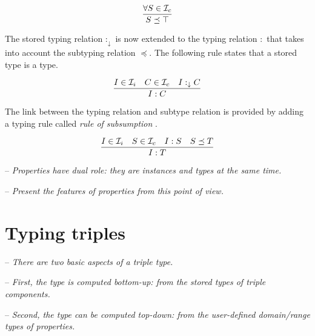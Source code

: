 \documentclass[runningheads]{llncs}
\newcommand{\darr}{\downarrow}
\newcommand{\Ii}{{\cal I}_i}
\newcommand{\Ic}{{\cal I}_c}
\newcommand{\memo}[1]{}
\newcommand{\notes}[1]{\noindent\begin{small}-- \emph{#1}\\\end{small}}
\begin{document}
\begin{equation}
\dfrac{\forall\/S\in\Ic}
      {S\preceq\top}
\end{equation}

The stored typing relation $:_\darr$ is now extended to the typing
relation $:$ that takes into account the subtyping relation $\preceq$.
The following rule states that a stored type is a type.

\begin{equation}
\dfrac{I\in\Ii \quad C\in\Ic \quad I:_\darr\/C}
      {I:C}
\end{equation}

The link between the typing relation and subtype relation is provided
by adding a typing rule called \emph{rule of subsumption}
\cite{Pierce02TypesProgLang}.

\begin{equation}
\dfrac{I\in\Ii\quad S\in\Ic\quad I:S \quad S\preceq\/T}
      {I:T}    
\end{equation}


\notes{Properties have dual role: they are instances and types at the same time.}
\notes{Present the features of properties from this point of view.}

\memo{Put together the base types of ground identifiers using $\land$ type.}
\memo{First, the base type of an ground identifier is the $\land$ of all base types.}
\memo{The \emph{base type} of a ground identifier is defined explicitely!}

\memo{The lub types of base types B are the smallest types related to all base types.}
\memo{The lub types are related by $\land$ to form a (complete) type of a ground identifier.}
\memo{The complete type of a ground identifier is defined explicitely.}








\section{Typing triples}

\notes{There are two basic aspects of a triple type.}
\notes{First, the type is computed bottom-up: from the stored types of triple components.}
\notes{Second, the type can be computed top-down: from the user-defined domain/range types of properties.}
\end{document}
